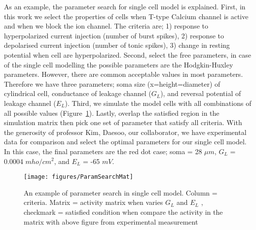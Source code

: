  As an example, the parameter search for single cell model is explained. First, in this work we select the properties of cells when T-type Calcium channel is active and when we block the ion channel. The criteria are; 1) response to hyperpolarized current injection (number of burst spikes), 2) response to depolarised current injection (number of tonic spikes), 3) change in resting potential when cell are hyperpolarized.
Second, select the free parameters, in case of the single cell modelling the possible parameters are the Hodgkin-Huxley parameters. However, there are common acceptable values in most parameters. Therefore we have three parameters; soma size (x=height=diameter) of cylindrical cell, conductance of leakage channel ($G_L$), and reversal potential of leakage channel ($E_L$).
Third, we simulate the model cells with all combinations of all possible values (Figure~\ref{fig:ParamS}). Lastly, overlap the satisfied region in the simulation matrix then pick one set of parameter that satisfy all criteria. With the generosity of professor Kim, Daesoo, our collaborator, we have experimental data for comparison and select the optimal parameters for our single cell model. In this case, the final parameters are the red dot case; soma = 28 $\mu m$, $G_L$ = 0.0004 $mho/cm^2$, and $E_L$ = -65 $mV$.


\begin{figure}
	\centering
	\texttt{[image: figures/ParamSearchMat]}
	\caption[Example of Parameter Search]{An example of parameter search in single cell model. Column = criteria. Matrix = activity matrix when varies $G_L$ and $E_L$ , checkmark = satisfied condition when compare the activity in the matrix with above figure from experimental measurement}
	\label{fig:ParamS}
\end{figure}

%
%
%
%
%

